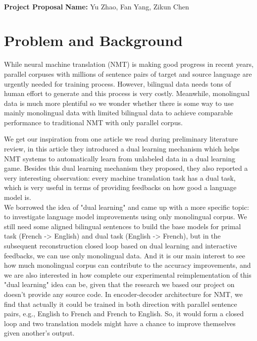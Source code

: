 \documentclass[11pt]{article}
\begin{document}
\\
{{\bf Project Proposal}} \hfill {{\bf Name:} Yu Zhao, Fan Yang, Zikun Chen} \\
\part{Problem and Background}
While neural machine translation (NMT) is making good progress in recent years, parallel corpuses with millions of sentence pairs of target and source language are urgently needed for training process. However, bilingual data needs tons of human effort to generate and this process is very costly. Meanwhile, monolingual data is much more plentiful so we wonder whether there is some way to use mainly monolingual data with limited bilingual data to achieve comparable performance to traditional NMT with only parallel corpus.


We get our inspiration from one article we read during preliminary literature review, in this article they introduced a dual learning mechanism which helps NMT systems to automatically learn from unlabeled data in a dual learning game. Besides this dual learning mechanism they proposed, they also reported a very interesting observation: every machine translation task has a dual task, which is very useful in terms of providing feedbacks on how good a language model is. 
\\
\indent We borrowed the idea of "dual learning" and came up with a more specific topic: to investigate language model improvements using only monolingual corpus. We still need some aligned bilingual sentences to build the base models for primal task (French -> English) and dual task (English -> French), but in the subsequent reconstruction closed loop based on dual learning and interactive feedbacks, we can use only monolingual data. And it is our main interest to see how much monolingual corpus can contribute to the accuracy improvements, and we are also interested in how complete our experimental reimplementation of this "dual learning" idea can be, given that the research we based our project on doesn't provide any source code.
In encoder-decoder architecture for NMT, we find that actually it could be trained in both direction with parallel sentence pairs, e.g., English to French and French to English. So, it would form a closed loop and two translation models might have a chance to improve themselves given another's output.
\end{document}

